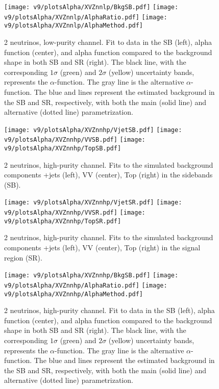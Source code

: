 \begin{figure}[!htb]
  \centering
    \texttt{[image: v9/plotsAlpha/XVZnnlp/BkgSB.pdf]}
    \texttt{[image: v9/plotsAlpha/XVZnnlp/AlphaRatio.pdf]}
    \texttt{[image: v9/plotsAlpha/XVZnnlp/AlphaMethod.pdf]}
  \caption{2 neutrinos, low-purity channel. Fit to data in the SB (left), alpha function (center), and alpha function compared to the background shape in both SB and SR (right). The black line, with the corresponding $1\sigma$ (green) and $2\sigma$ (yellow) uncertainty bands, represents the $\alpha$-function. The gray line is the alternative $\alpha$-function. The blue and lines represent the estimated background in the SB and SR, respectively, with both the main (solid line) and alternative (dotted line) parametrization.}
  \label{fig:XVZnnlp_Alpha}
\end{figure}


\begin{figure}[!htb]
  \centering
    \texttt{[image: v9/plotsAlpha/XVZnnhp/VjetSB.pdf]}
    \texttt{[image: v9/plotsAlpha/XVZnnhp/VVSB.pdf]}
    \texttt{[image: v9/plotsAlpha/XVZnnhp/TopSB.pdf]}
    \caption{2 neutrinos, high-purity channel. Fits to the simulated background components \V+jets (left), VV (center), Top (right) in the sidebands (SB).}
  \label{fig:XVZnnhp_SB}
\end{figure}

\begin{figure}[!htb]
  \centering
    \texttt{[image: v9/plotsAlpha/XVZnnhp/VjetSR.pdf]}
    \texttt{[image: v9/plotsAlpha/XVZnnhp/VVSR.pdf]}
    \texttt{[image: v9/plotsAlpha/XVZnnhp/TopSR.pdf]}
    \caption{2 neutrinos, high-purity channel. Fits to the simulated background components \V+jets (left), VV (center), Top (right) in the signal region (SR).}
  \label{fig:XVZnnhp_SR}
\end{figure}

\begin{figure}[!htb]
  \centering
    \texttt{[image: v9/plotsAlpha/XVZnnhp/BkgSB.pdf]}
    \texttt{[image: v9/plotsAlpha/XVZnnhp/AlphaRatio.pdf]}
    \texttt{[image: v9/plotsAlpha/XVZnnhp/AlphaMethod.pdf]}
  \caption{2 neutrinos, high-purity channel. Fit to data in the SB (left), alpha function (center), and alpha function compared to the background shape in both SB and SR (right). The black line, with the corresponding $1\sigma$ (green) and $2\sigma$ (yellow) uncertainty bands, represents the $\alpha$-function. The gray line is the alternative $\alpha$-function. The blue and lines represent the estimated background in the SB and SR, respectively, with both the main (solid line) and alternative (dotted line) parametrization.}
  \label{fig:XVZnnhp_Alpha}
\end{figure}

